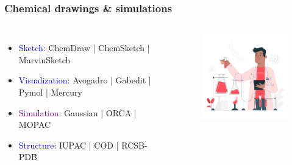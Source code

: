 \documentclass[newPxFont,sthlmFooter]{beamer}
\newcommand{\fs}{\footnotesize}
\begin{document}
\begin{frame}\frametitle{Chemical drawings \& simulations}
  \begin{columns}[T,onlytextwidth]
      \vspace{1cm}
  \begin{itemize}
    \fs
	\item \textcolor{blue}{Sketch:} ChemDraw | ChemSketch | MarvinSketch
	\item \textcolor{blue}{Visualization:} Avogadro | Gabedit | Pymol | Mercury
	\item \textcolor{purple}{Simulation:} Gaussian | ORCA | MOPAC
	\item \textcolor{blue}{Structure:} IUPAC | COD | RCSB-PDB
  \end{itemize}
        \vspace{0.5cm}
              \vspace{-0.5cm}
  \begin{figure}
    \centering
    \includegraphics[width=2in]{figs/che} 
  \end{figure}
  \end{columns}
\end{frame}
\end{document}
